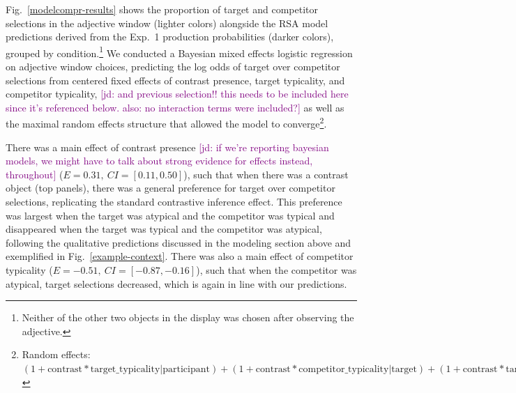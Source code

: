 \documentclass[10pt,letterpaper]{article}
\newcommand{\jd}[1]{\textcolor{Purple}{[jd: #1]}}
\newcommand{\figref}[1]{Fig.~\ref{#1}}
\begin{document}
\figref{modelcompr-results} shows the proportion of target and competitor selections in the adjective window (lighter colors) alongside the RSA model predictions derived from the Exp.~1 production probabilities (darker colors), grouped by condition.\footnote{Neither of the other two objects in the display was chosen after observing the adjective.} %
We conducted a Bayesian mixed effects logistic regression on adjective window choices, predicting the log odds of target over competitor selections from centered fixed effects of contrast presence, target typicality, and competitor typicality, \jd{and previous selection!! this needs to be included here since it's referenced below. also: no interaction terms were included?} as well as the maximal random effects structure that allowed the model to converge\footnote{Random effects: $(1+\text{contrast}*\text{target\_typicality}|\text{participant}) + (1+\text{contrast}*\text{competitor\_typicality}|\text{target}) + (1+\text{contrast}*\text{target\_typicality}|\text{competitor})$}.

There was a main effect of contrast presence \jd{if we're reporting bayesian models, we might have to talk about strong evidence for effects instead, throughout} ($E=0.31,\ CI=[0.11,0.50]$), such that when there was a contrast object (top panels), there was a general preference for target over competitor selections, replicating the standard contrastive inference effect. This preference was largest when the target was atypical and the competitor was typical and disappeared when the target was typical and the competitor was atypical, following the qualitative predictions discussed in the modeling section above and exemplified in \figref{example-context}. There was also a main effect of competitor typicality ($E=-0.51,\ CI=[-0.87,-0.16]$), such that when the competitor was atypical, target selections decreased, which is again in line with our predictions.


\end{document}
